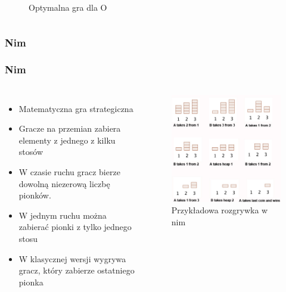 \documentclass[polish,envcountsect,10pt]{beamer}
\begin{document}
\begin{frame}
\begin{columns}
\begin{figure}[H]
                            \caption{Optymalna gra dla O}
                        \end{figure}
                    \end{columns}
                \end{frame}
            \subsubsection{Nim}
                \begin{frame}
                    \frametitle{Nim}
                    \begin{columns}
                        \begin{itemize}
                            \item<1-> Matematyczna gra strategiczna
                            \item<2-> Gracze na przemian zabiera elementy z jednego z kilku stosów
                            \item<3-> W czasie ruchu gracz bierze dowolną niezerową liczbę pionków.
                            \item<4-> W jednym ruchu można zabierać pionki z tylko jednego stosu
                            \item<5-> W klasycznej wersji wygrywa gracz, który zabierze ostatniego pionka
                        \end{itemize}
                        \begin{figure}[H]
                            \centering
                            \includegraphics[width=\textwidth]{images/nim_game}
                            \caption{Przykładowa rozgrywka w nim}
                        \end{figure}
                    \end{columns}
                \end{frame}
\end{document}
